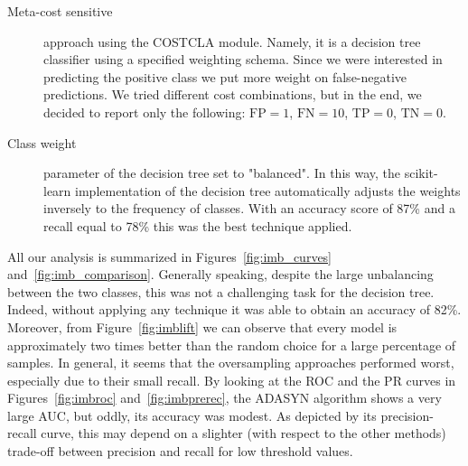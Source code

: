 \documentclass[10pt, a4paper, twocolumn]{article}
\begin{document}
\begin{description}
\item [Meta-cost sensitive] approach using the COSTCLA module. Namely, it is a decision tree classifier using a specified weighting schema. Since we were interested in predicting the positive class we put more weight on false-negative predictions. We tried different cost combinations, but in the end, we decided to report only the following: $\mathrm{FP}=1$, $\mathrm{FN}=10$, $\mathrm{TP}=0$, $\mathrm{TN}=0$.
\item [Class weight] parameter of the decision tree set to "balanced". In this way, the scikit-learn implementation of the decision tree automatically adjusts the weights inversely to the frequency of classes. With an accuracy score of 87\% and a recall equal to 78\% this was the best technique applied. 
\end{description}

All our analysis is summarized in Figures~\ref{fig:imb_curves} and~\ref{fig:imb_comparison}. Generally speaking, despite the large unbalancing between the two classes, this was not a challenging task for the decision tree. Indeed, without applying any technique it was able to obtain an accuracy of 82\%. Moreover, from Figure~\ref{fig:imblift} we can observe that every model is approximately two times better than the random choice for a large percentage of samples. In general, it seems that the oversampling approaches performed worst, especially due to their small recall. By looking at the ROC and the PR curves in Figures~\ref{fig:imbroc} and~\ref{fig:imbprerec}, the ADASYN algorithm shows a very large AUC, but oddly, its accuracy was modest. As depicted by its precision-recall curve, this may depend on a slighter (with respect to the other methods) trade-off between precision and recall for low threshold values.
\end{document}
